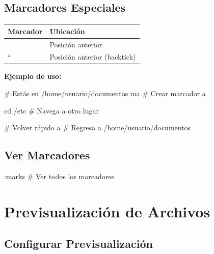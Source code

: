 \documentclass[
  doc,
  floatsintext,
  longtable,
  a4paper,
  nolmodern,
  notxfonts,
  notimes,
  12pt,
  colorlinks=true,linkcolor=blue,citecolor=blue,urlcolor=blue]{apa7}
\newenvironment{Shaded}{\begin{snugshade}}{\end{snugshade}}
\newcommand{\BuiltInTok}[1]{\textcolor[rgb]{0.00,0.23,0.31}{#1}}
\newcommand{\CommentTok}[1]{\textcolor[rgb]{0.37,0.37,0.37}{#1}}
\newcommand{\ExtensionTok}[1]{\textcolor[rgb]{0.00,0.23,0.31}{#1}}
\newcommand{\NormalTok}[1]{\textcolor[rgb]{0.00,0.23,0.31}{#1}}
\newcommand{\StringTok}[1]{\textcolor[rgb]{0.13,0.47,0.30}{#1}}
\newcounter{none} %
\begin{document}
\subsection{Marcadores Especiales}\label{marcadores-especiales}

{\def\LTcaptype{none} %
\begin{longtable}[]{@{}ll@{}}
\toprule\noalign{}
Marcador & Ubicación \\
\midrule\noalign{}
\endhead
\bottomrule\noalign{}
\endlastfoot
\texttt{\textquotesingle{}\textquotesingle{}} & Posición anterior \\
\texttt{} `` & Posición anterior (backtick) \\
\end{longtable}
}

\textbf{Ejemplo de uso:}

\begin{Shaded}
\begin{Highlighting}[]
\CommentTok{\# Estás en /home/usuario/documentos}
\ExtensionTok{ma}        \CommentTok{\# Crear marcador \textquotesingle{}a\textquotesingle{}}

\BuiltInTok{cd}\NormalTok{ /etc   }\CommentTok{\# Navega a otro lugar}

\CommentTok{\# Volver rápido}
\StringTok{\textquotesingle{}a        \# Regresa a /home/usuario/documentos}
\end{Highlighting}
\end{Shaded}

\subsection{Ver Marcadores}\label{ver-marcadores}

\begin{Shaded}
\begin{Highlighting}[]
\ExtensionTok{:marks}    \CommentTok{\# Ver todos los marcadores}
\end{Highlighting}
\end{Shaded}

\section{Previsualización de
Archivos}\label{previsualizaciuxf3n-de-archivos}

\subsection{Configurar
Previsualización}\label{configurar-previsualizaciuxf3n}
\end{document}
